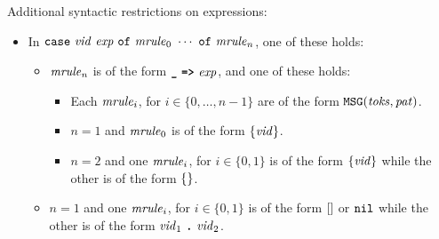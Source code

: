 \documentclass[final]{article}
\begin{document}
\noindent
Additional syntactic restrictions on expressions:
\begin{itemize}


\item
  In
  $\mathtt{case}\ \mathit{vid}\ \mathit{exp}{\ \mathtt{of}\ \mathit{mrule}_0\ \cdots\ \mathtt{of}\ \mathit{mrule}_n}$,
  one of these holds:
  \begin{itemize}
  \item $\mathit{mrule}_n$ is of the form
    $\textbf{\texttt{\_}}\ \textbf{\texttt{=>}}\ \mathit{exp}$, and one of these holds:
    \begin{itemize}
    \item
      Each $\mathit{mrule}_i$, for $i\in\{0,\dots,n-1\}$ are of the form
      $\mathtt{MSG}(\mathit{toks},\mathit{pat})$.
    \item
      $n=1$ and $\mathit{mrule}_{0}$ is of the form
      $\{\mathit{vid}\}$.
    \item
      $n=2$ and one $\mathit{mrule}_i$, for $i\in\{0,1\}$ is of the form
      $\{\mathit{vid}\}$ while the other is of the form
      $\{\}$.
    \end{itemize}
  \item $n=1$ and one $\mathit{mrule}_i$, for $i\in\{0,1\}$ is of the form
    $[]$ or $\mathtt{nil}$ while the other is of the form
    $\mathit{vid}_1\ \textbf{\texttt{.}}\ \mathit{vid}_2$.
  \end{itemize}
\end{itemize}
\end{document}
